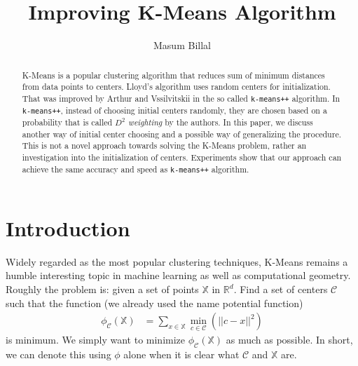 \documentclass[10pt, leqno]{article}
\author{Masum Billal}
\title{\bfseries Improving K-Means Algorithm}
\begin{document}
	\maketitle
		\begin{abstract}
			K-Means is a popular clustering algorithm that reduces sum of minimum distances from data points to centers. Lloyd's algorithm uses random centers for initialization. That was improved by Arthur and Vssilvitskii \cite{kmeans++} in the so called \texttt{k-means++} algorithm. In \texttt{k-means++}, instead of choosing initial centers randomly, they are chosen based on a probability that is called \textit{$D^2$ weighting} by the authors. In this paper, we discuss another way of initial center choosing and a possible way of generalizing the procedure. This is not a novel approach towards solving the K-Means problem, rather an investigation into the initialization of centers. Experiments show that our approach can achieve the same accuracy and speed as \texttt{k-means++} algorithm.
		\end{abstract}
	\section{Introduction}
	Widely regarded as the most popular clustering techniques, K-Means remains a humble interesting topic in machine learning as well as computational geometry. Roughly the problem is: given a set of points $\mathbb{X}$ in $\mathbb{R}^d$. Find a set of centers $\mathcal{C}$ such that the function (we already used the name potential function)
		\begin{align*}
			\phi_{\mathcal{C}}(\mathbb{X}) & = \sum_{x\in\mathbb{X}}\min_{c\in\mathcal{C}}(||c-x||^2)
		\end{align*}
	is minimum. We simply want to minimize $\phi_{\mathcal{C}}(\mathbb{X})$ as much as possible. In short, we can denote this using $\phi$ alone when it is clear what $\mathcal{C}$ and $\mathbb{X}$ are.
	
\end{document}
